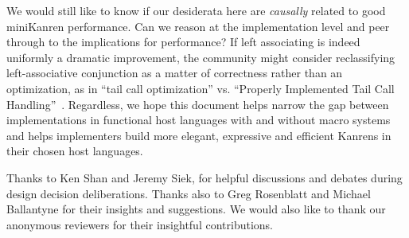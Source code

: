 \documentclass[sigplan,balance,pbalance,natbib=false]{acmart}
\begin{document}
We would still like to know if our desiderata here are \emph{causally}
related to good miniKanren performance. Can we reason at the
implementation level and peer through to the implications for
performance? If left associating  is indeed uniformly
a dramatic improvement, the community might consider reclassifying
left-associative conjunction as a matter of correctness rather than an
optimization, as in \enquote{tail call optimization} vs.
\enquote{Properly Implemented Tail Call
  Handling}~\cite{felleisen2014requestions}. Regardless, we hope this
document helps narrow the gap between implementations in functional
host languages with and without macro systems and helps implementers
build more elegant, expressive and efficient Kanrens in their chosen
host languages.

\begin{acks}

  Thanks to Ken Shan and Jeremy Siek, for helpful discussions and
  debates during design decision deliberations. Thanks also to Greg
  Rosenblatt and Michael Ballantyne for their insights and
  suggestions. We would also like to thank our anonymous reviewers
  for their insightful contributions.

\end{acks}

\printbibliography{}
\end{document}
